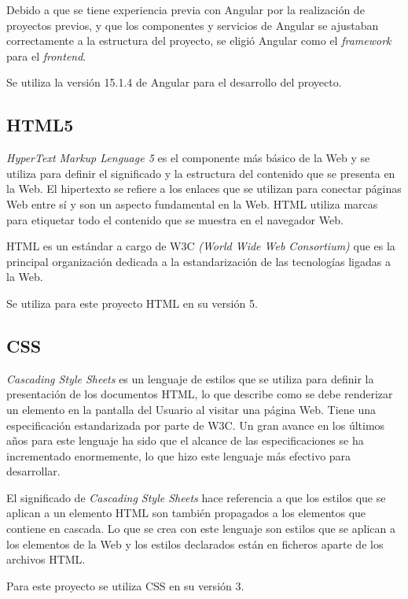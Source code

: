  Debido a que se tiene experiencia previa con Angular por la realización de proyectos previos, y que los componentes y servicios de Angular se ajustaban correctamente a la estructura del proyecto, se eligió Angular como el \textit{framework} para el \textit{frontend}. 

Se utiliza la versión 15.1.4 de Angular para el desarrollo del proyecto.

\subsection{HTML5}
\textit{HyperText Markup Lenguage 5} \cite{HTML} es el componente más básico de la Web y se utiliza para definir el significado y la estructura del contenido que se presenta en la Web. El hipertexto se refiere a los enlaces que se utilizan para conectar páginas Web entre sí y son un aspecto fundamental en la Web. HTML utiliza marcas para etiquetar todo el contenido que se muestra en el navegador Web.

HTML es un estándar a cargo de W3C \textit{(World Wide Web Consortium)} que es la principal organización dedicada a la estandarización de las tecnologías ligadas a la Web.

Se utiliza para este proyecto HTML en su versión 5.

\subsection{CSS}
\textit{Cascading Style Sheets} \cite{CSS} es un lenguaje de estilos que se utiliza para definir la presentación de los documentos HTML, lo que describe como se debe renderizar un elemento en la pantalla del Usuario al visitar una página Web. Tiene una especificación estandarizada por parte de W3C. Un gran avance en los últimos años para este lenguaje ha sido que el alcance de las especificaciones se ha incrementado enormemente, lo que hizo este lenguaje más efectivo para desarrollar.

El significado de \textit{Cascading Style Sheets} hace referencia a que los estilos que se aplican a un elemento HTML son también propagados a los elementos que contiene en cascada. Lo que se crea con este lenguaje son estilos que se aplican a los elementos de la Web y los estilos declarados están en ficheros aparte de los archivos HTML.

Para este proyecto se utiliza CSS en su versión 3.



